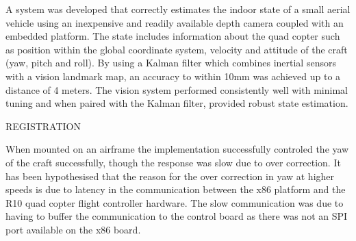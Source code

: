 \documentclass[]{article}
\begin{document}
{A system was developed that correctly estimates the indoor state of a small aerial vehicle using an inexpensive and readily available depth camera coupled with an embedded platform. The state includes information about the quad copter such as position within the global coordinate system, velocity and attitude of the craft (yaw, pitch and roll). By using a Kalman filter which combines inertial sensors with a vision landmark map, an accuracy to within 10mm was achieved up to a distance of 4 meters. The vision system performed consistently well with minimal tuning and when paired with the Kalman filter, provided robust state estimation.


REGISTRATION

When mounted on an airframe the implementation successfully controled the yaw of the craft successfully, though the response was slow due to over correction. It has been hypothesised that the reason for the over correction in yaw at higher speeds is due to latency in the communication between the x86 platform and the R10 quad copter flight controller hardware. The slow communication was due to having to buffer the communication to the control board as there was not an SPI port available on the x86 board.



}
\end{document}
